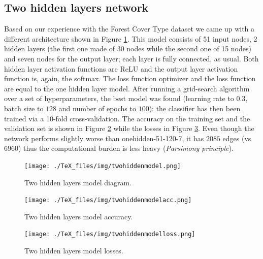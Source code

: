 \subsection{Two hidden layers network}
\label{sec:twohidden}
Based on our experience with the Forest Cover Type dataset we came up with a different architecture shown in Figure \ref{fig:twohiddenmodel}. This model consists of 51 input nodes, 2 hidden layers (the first one made of 30 nodes while the second one of 15 nodes) and seven nodes for the output layer; each layer is fully connected, as usual. Both hidden layer activation functions are ReLU and the output layer activation function is, again, the softmax. The loss function optimizer and the loss function are equal to the one hidden layer model.
After running a grid-search algorithm over a set of hyperparameters, the best model was found (learning rate to $0.3$, batch size to $128$ and number of epochs to $100$): the classifier has then been trained via a 10-fold cross-validation. The accuracy on the training set and the validation set is shown in Figure \ref{fig:twohiddenmodelacc} while the losses in Figure \ref{fig:twohiddenmodelloss}. Even though the network performs slightly worse than onehidden-51-120-7, it has $2085$ edges (vs $6960$) thus the computational burden is less heavy (\textit{Parsimony principle}).

\begin{figure}
\centering
\texttt{[image: ./TeX\_files/img/twohiddenmodel.png]}
\caption{Two hidden layers model diagram.}
\label{fig:twohiddenmodel}
\end{figure}

\begin{figure}[H]
\centering
\texttt{[image: ./TeX\_files/img/twohiddenmodelacc.png]}
\caption{Two hidden layers model accuracy.}
\label{fig:twohiddenmodelacc}
\end{figure}

\begin{figure}
\centering
\texttt{[image: ./TeX\_files/img/twohiddenmodelloss.png]}
\caption{Two hidden layers model losses.}
\label{fig:twohiddenmodelloss}
\end{figure}

